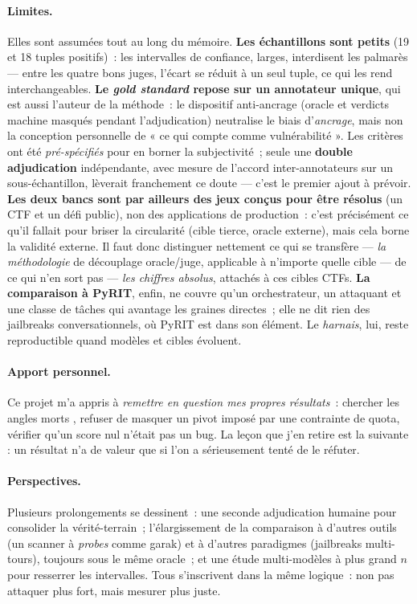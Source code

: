 \paragraph{Limites.} Elles sont assumées tout au long du mémoire. \textbf{Les échantillons sont petits} (19 et 18 tuples positifs)~: les intervalles de confiance, larges, interdisent les palmarès — entre les quatre bons juges, l'écart se réduit à un seul tuple, ce qui les rend interchangeables. \textbf{Le \emph{gold standard} repose sur un annotateur unique}, qui est aussi l'auteur de la méthode~: le dispositif anti-ancrage (oracle et verdicts machine masqués pendant l'adjudication) neutralise le biais d'\emph{ancrage}, mais non la conception personnelle de « ce qui compte comme vulnérabilité ». Les critères ont été \emph{pré-spécifiés} pour en borner la subjectivité~; seule une \textbf{double adjudication} indépendante, avec mesure de l'accord inter-annotateurs sur un sous-échantillon, lèverait franchement ce doute — c'est le premier ajout à prévoir. \textbf{Les deux bancs sont par ailleurs des jeux conçus pour être résolus} (un CTF et un défi public), non des applications de production~: c'est précisément ce qu'il fallait pour briser la circularité (cible tierce, oracle externe), mais cela borne la validité externe. Il faut donc distinguer nettement ce qui se transfère — \emph{la méthodologie} de découplage oracle/juge, applicable à n'importe quelle cible — de ce qui n'en sort pas — \emph{les chiffres absolus}, attachés à ces cibles CTFs. \textbf{La comparaison à PyRIT}, enfin, ne couvre qu'un orchestrateur, un attaquant et une classe de tâches qui avantage les graines directes~; elle ne dit rien des jailbreaks conversationnels, où PyRIT est dans son élément. Le \emph{harnais}, lui, reste reproductible quand modèles et cibles évoluent.

\paragraph{Apport personnel.} Ce projet m'a appris à \emph{remettre en question mes propres résultats}~: chercher les angles morts , refuser de masquer un pivot imposé par une contrainte de quota, vérifier qu'un score nul n'était pas un bug. La leçon que j'en retire est la suivante : un résultat n'a de valeur que si l'on a sérieusement tenté de le réfuter.

\paragraph{Perspectives.} Plusieurs prolongements se dessinent~: une seconde adjudication humaine pour consolider la vérité-terrain~; l'élargissement de la comparaison à d'autres outils (un scanner à \emph{probes} comme garak) et à d'autres paradigmes (jailbreaks multi-tours), toujours sous le même oracle~; et une étude multi-modèles à plus grand $n$ pour resserrer les intervalles. Tous s'inscrivent dans la même logique~: non pas attaquer plus fort, mais mesurer plus juste.
